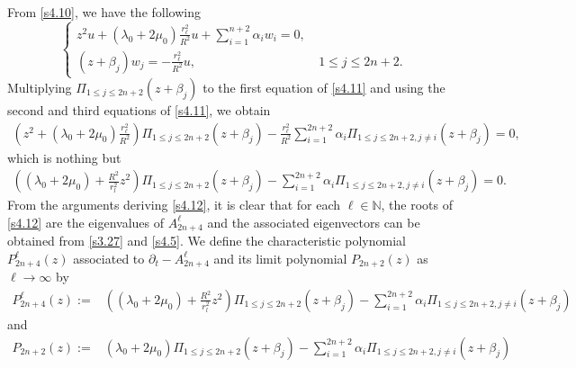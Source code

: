 \documentclass[a4paper,12pt]{article}
\newtheorem{a priori condition}[Th]{A priori condition}
\begin{document}
From \eqref{s4.10},  we have the following
\begin{equation}\label{s4.11}
\left\{
\begin{array}{ll}
z^2u+(\lambda_0+2\mu_0)\frac{r_\ell^2}{R^2} u+  \sum_{i=1}^{n+2} \alpha_iw_i=0,\\
(z+\beta_j)w_j=-\frac{r_\ell^2}{R^2} u, \qquad\quad&\ 1\leq j \leq 2n+2.
\end{array}
\right.
\end{equation}
Multiplying $\Pi_{1\leq j\leq 2n+2}(z+\beta_j)$ to the first equation of \eqref{s4.11} and using the second and third equations of \eqref{s4.11}, we obtain
\begin{equation}\label{s4.12}
\begin{aligned}
(z^2+(\lambda_0+2\mu_0)\frac{r_\ell^2}{R^2})\Pi_{1\leq j\leq 2n+2}(z+\beta_j) - \frac{r_\ell^2}{R^2} \sum_{i=1}^{2n+2} \alpha_i\Pi_{1\leq j\leq 2n+2,j\neq i}(z+\beta_j)=0,
\end{aligned}
\end{equation}
which is nothing but
\begin{equation}\label{s4.13}
\begin{aligned}
((\lambda_0+2\mu_0)+\frac{R^2}{r_l^2}z^2)\Pi_{1\leq j\leq 2n+2}(z+\beta_j) -  \sum_{i=1}^{2n+2} \alpha_i\Pi_{1\leq j\leq 2n+2,j\neq i}(z+\beta_j)=0.
\end{aligned}
\end{equation}
From the arguments deriving \eqref{s4.12}, it is clear that for each $\ell\in{\mathbb N}$, the roots of \eqref{s4.12} are the eigenvalues of $A_{2n+4}^\ell$ and the associated eigenvectors can be obtained from \eqref{s3.27} and \eqref{s4.5}.
We define the characteristic polynomial $P^\ell_{2n+4}(z)$ associated to $\partial_t-A_{2n+4}^\ell$ and its limit polynomial $P_{2n+2}(z)$ as $\ell\rightarrow\infty$ by
\begin{equation}\label{s4.14}
\begin{aligned}
P^\ell_{2n+4}(z):=&((\lambda_0+2\mu_0)+\frac{R^2}{r_l^2}z^2)\Pi_{1\leq j\leq 2n+2}(z+\beta_j) -  \sum_{i=1}^{2n+2} \alpha_i\Pi_{1\leq j\leq 2n+2,j\neq i}(z+\beta_j)
\end{aligned}
\end{equation}
and
\begin{equation}\label{s4.15}
\begin{aligned}
P_{2n+2}(z):=&(\lambda_0+2\mu_0)\Pi_{1\leq j\leq 2n+2}(z+\beta_j) - \sum_{i=1}^{2n+2} \alpha_i\Pi_{1\leq j\leq 2n+2,j\neq i}(z+\beta_j)
\end{aligned}
\end{equation}
\end{document}
